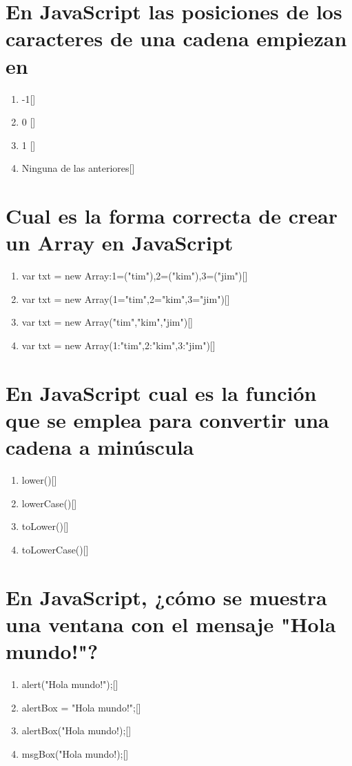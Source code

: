 \documentclass[addpoints, 12]{exam}{article}
\begin{document}
\section{En JavaScript las posiciones de los caracteres de una cadena empiezan en}
\label{sec:orge0ff886}
\begin{enumerate}
\item -1[]
\item 0 []
\item 1 []
\item Ninguna de las anteriores[]
\end{enumerate}

\section{Cual es la forma correcta de crear un Array en JavaScript}
\label{sec:org3008734}
\begin{enumerate}
\item var txt = new Array:1=("tim"),2=("kim"),3=("jim")[]
\item var txt = new Array(1="tim",2="kim",3="jim")[]
\item var txt = new Array("tim","kim","jim")[]
\item var txt = new Array(1:"tim",2:"kim",3:"jim")[]
\end{enumerate}

\section{En JavaScript cual es la función que se emplea para convertir una cadena a minúscula}
\label{sec:org5a7ff2e}
\begin{enumerate}
\item lower()[]
\item lowerCase()[]
\item toLower()[]
\item toLowerCase()[]
\end{enumerate}

\section{En JavaScript, ¿cómo se muestra una ventana con el mensaje "Hola mundo!"?}
\label{sec:org0f65172}
\begin{enumerate}
\item alert("Hola mundo!");[]
\item alertBox = "Hola mundo!";[]
\item alertBox("Hola mundo!);[]
\item msgBox("Hola mundo!);[]
\end{enumerate}
\end{document}

